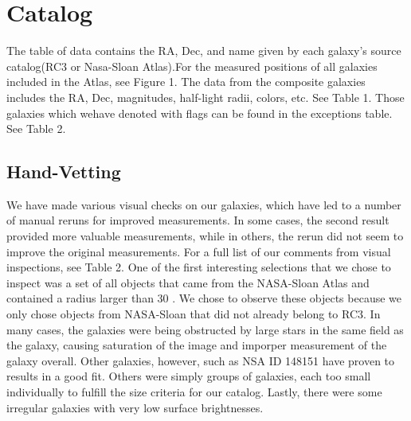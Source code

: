 \documentclass[12pt,preprint,pdftex]{aastex}
\newcommand{\units}[1]{\mathrm{#1}}
\renewcommand{\arcsec}{\units{arcsec}}
\begin{document}

\section{Catalog}
The table of data contains the RA, Dec, and name given by each galaxy's source catalog(RC3 or Nasa-Sloan Atlas).For the measured positions of all galaxies included in the Atlas, see Figure 1. The data from the composite galaxies includes the RA, Dec, magnitudes, half-light radii, colors, etc. See Table 1. Those galaxies which wehave denoted with flags can be found in the exceptions table. See Table 2. 


\subsection{Hand-Vetting}
We have made various visual checks on our galaxies, which have led to a number of manual reruns for improved measurements. In some cases, the second result provided more valuable measurements, while in others, the rerun did not seem to improve the original measurements. For a full list of our comments from visual inspections, see Table 2. One of the first interesting selections that we chose to inspect was a set of all objects that came from the NASA-Sloan Atlas and contained a radius larger than 30 \arcsec. We chose to observe these objects because we only chose objects from NASA-Sloan that did not already belong to RC3. In many cases, the galaxies were being obstructed by large stars in the same field as the galaxy, causing saturation of the image and imporper measurement of the galaxy overall. Other galaxies, however, such as NSA ID 148151 have proven to results in a good fit. Others were simply groups of galaxies, each too small individually to fulfill the size criteria for our catalog. Lastly, there were some irregular galaxies with very low surface brightnesses.

\end{document}
